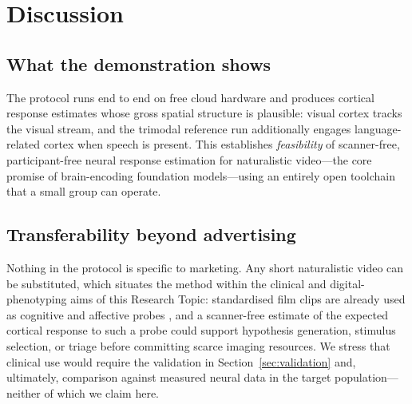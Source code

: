 \documentclass[11pt]{article}
\begin{document}
\section{Discussion}
\label{sec:discussion}

\subsection{What the demonstration shows}
The protocol runs end to end on free cloud hardware and produces cortical
response estimates whose gross spatial structure is plausible: visual cortex
tracks the visual stream, and the trimodal reference run additionally engages
language-related cortex when speech is present. This establishes
\emph{feasibility} of scanner-free, participant-free neural response estimation
for naturalistic video---the core promise of brain-encoding foundation
models---using an entirely open toolchain that a small group can operate.

\subsection{Transferability beyond advertising}
\label{sec:transfer}
Nothing in the protocol is specific to marketing. Any short naturalistic video
can be substituted, which situates the method within the clinical and
digital-phenotyping aims of this Research Topic: standardised film clips are
already used as cognitive and affective probes \citep{hasson2004}, and a
scanner-free estimate of
the expected cortical response to such a probe could support
hypothesis generation, stimulus selection, or triage before committing scarce
imaging resources. We stress that clinical use would require the validation in
Section~\ref{sec:validation} and, ultimately, comparison against measured
neural data in the target population---neither of which we claim here.
\end{document}

